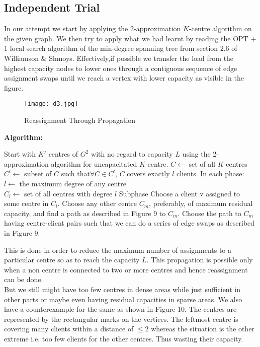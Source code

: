 \documentclass[12pt,a4paper,onecolumn]{article}
\begin{document}
\subsection{Independent Trial}
In our attempt we start by applying the 2-approximation $K$-centre algorithm on the given graph. We then try to apply what we had learnt by reading the OPT + 1 local search algorithm of the min-degree spanning tree from section 2.6 of Williamson \& Shmoys. Effectively,if possible we transfer the load from the highest capacity nodes to lower ones through a contiguous sequence of edge assignment swaps until we reach a vertex with lower capacity as visible in the figure. \\
\begin{figure}[H]
\begin{center}
\texttt{[image: d3.jpg]}
  \caption{Reassignment Through Propagation}
  \label{Figure 13}
\end{center}
\end{figure}
\textbf{Algorithm:}
\begin{algorithmic}[1]
\STATE Start with $K'$ centres of $G^2$ with no regard to capacity $L$ using the 2-approximation algorithm for uncapacitated $K$-centre.
\STATE $C \leftarrow$ set of all $K$-centres
\STATE $C^l \leftarrow$ subset of $C$ such that$\forall C \in C^l$, $C$ covers exactly $l$ clients.
\STATE In each phase:\\
\STATE \hspace{1cm}$l \leftarrow$ the maximum degree of any centre\\
\STATE \hspace{1cm}$C_l \leftarrow$ set of all centres with degree $l$
\STATE Subphase
\STATE Choose a client v assigned to some centre in $C_l$.
\STATE Choose any other centre $C_m$, preferably, of maximum residual capacity, and find a path as described in Figure 9 to $C_m$. Choose the path to $C_m$ having centre-client pairs such that we can do a series of edge swaps as described in Figure 9.
\ENDWHILE
\end{algorithmic}
This is done in order to reduce the maximum number of assignments to a particular centre so as to reach the capacity $L$. This propagation is possible only when a non centre is connected to two or more centres and hence reassignment can be done.\\
But we still might have too few centres in dense areas while just sufficient in other parts or maybe even having residual capacities in sparse areas. We also have a counterexample for the same as shown in Figure 10. The centres are represented by the rectangular marks on the vertices. The leftmost centre is covering many clients within a distance of $\leq 2$ whereas the situation is the other extreme i.e. too few clients for the other centres. Thus wasting their capacity.\\
\end{document}
